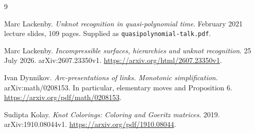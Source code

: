 \documentclass[11pt]{article}
\newcommand{\code}[1]{\texttt{#1}}
\begin{document}
\begin{thebibliography}{9}
\small\raggedright
\setlength{\itemsep}{2pt}
Marc Lackenby.
\emph{Unknot recognition in quasi-polynomial time}.
February 2021 lecture slides, 109 pages. Supplied as
\code{quasipolynomial-talk.pdf}.

Marc Lackenby.
\emph{Incompressible surfaces, hierarchies and unknot recognition}.
25 July 2026. arXiv:2607.23350v1.
\url{https://arxiv.org/html/2607.23350v1}.

Ivan Dynnikov.
\emph{Arc-presentations of links. Monotonic simplification}.
arXiv:math/0208153. In particular, elementary moves and Proposition 6.
\url{https://arxiv.org/pdf/math/0208153}.

Sudipta Kolay.
\emph{Knot Colorings: Coloring and Goeritz matrices}.
2019. arXiv:1910.08044v1.
\url{https://arxiv.org/pdf/1910.08044}.
\end{thebibliography}
\end{document}
